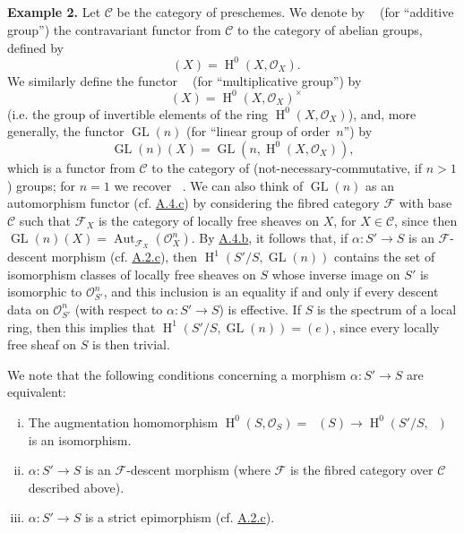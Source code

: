 \documentclass{article}
\newenvironment{rmenv}[1]
  {\phantomsection\par\medskip\noindent\textbf{#1.}\rmfamily}
  {\medskip}
\newcommand{\scr}[1]{{\mathscr{#1}}}
\renewcommand{\cal}[1]{{\mathcal{#1}}}
\DeclareMathOperator{\Aut}{Aut}
\DeclareMathOperator{\HH}{H}
\DeclareMathOperator{\GL}{GL}
\DeclareMathOperator{\Ga}{G_a}
\DeclareMathOperator{\Gm}{G_m}
\newcommand{\oldpage}[1]{\marginpar{\footnotesize$\Big\vert$ \textit{p.~#1}}}
\begin{document}
\subsection{}
\label{A.4.e}

\begin{rmenv}{Example 2}
  Let $\cal{C}$ be the category of preschemes.
  We denote by $\Ga$ (for ``additive group'') the contravariant functor from $\cal{C}$ to the category of abelian groups, defined by
  \[
    \Ga(X) = \HH^0(X,\scr{O}_X).
  \]
  We similarly define the functor $\Gm$ (for ``multiplicative group'') by
  \[
    \Gm(X) = \HH^0(X,\scr{O}_X)^\times
  \]
  (i.e. the group of invertible elements of the ring $\HH^0(X,\scr{O}_X)$), and, more generally, the functor $\GL(n)$ (for ``linear group of order~$n$'') by
\oldpage{190-15}
  \[
    \GL(n)(X) = \GL(n,\HH^0(X,\scr{O}_X)),
  \]
  which is a functor from $\cal{C}$ to the category of (not-necessary-commutative, if $n>1$) groups;
  for $n=1$ we recover $\Gm$.
  We can also think of $\GL(n)$ as an automorphism functor (cf. \hyperref[A.4.c]{A.4.c}) by considering the fibred category $\cal{F}$ with base $\cal{C}$ such that $\cal{F}_X$ is the category of locally free sheaves on $X$, for $X\in\cal{C}$, since then $\GL(n)(X)=\Aut_{\cal{F}_X}(\scr{O}_X^n)$.
  By \hyperref[A.4.b]{A.4.b}, it follows that, if $\alpha\colon S'\to S$ is an $\cal{F}$-descent morphism (cf. \hyperref[A.2.c]{A.2.c}), then $\HH^1(S'/S,\GL(n))$ contains the set of isomorphism classes of locally free sheaves on $S$ whose inverse image on $S'$ is isomorphic to $\scr{O}_{S'}^n$, and this inclusion is an equality if and only if every descent data on $\scr{O}_{S'}^n$ (with respect to $\alpha\colon S'\to S$) is effective.
  If $S$ is the spectrum of a local ring, then this implies that $\HH^1(S'/S,\GL(n))=(e)$, since every locally free sheaf on $S$ is then trivial.

  We note that the following conditions concerning a morphism $\alpha\colon S'\to S$ are equivalent:
  \begin{enumerate}[(i)]
    \item The augmentation homomorphism $\HH^0(S,\scr{O}_S) = \Ga(S)\to\HH^0(S'/S,\Ga)$ is an isomorphism.
    \item $\alpha\colon S'\to S$ is an $\cal{F}$-descent morphism (where $\cal{F}$ is the fibred category over $\cal{C}$ described above).
    \item $\alpha\colon S'\to S$ is a strict epimorphism (cf. \hyperref[A.2.c]{A.2.c}).
  \end{enumerate}


\end{rmenv}
\end{document}
